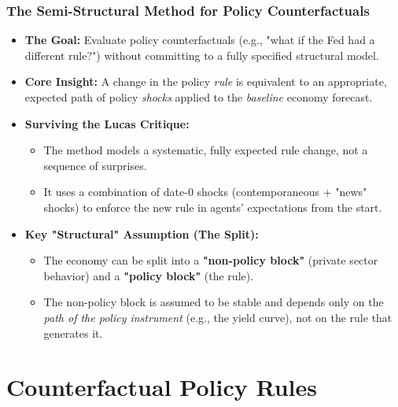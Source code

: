 \documentclass{beamer}
\begin{document}
\begin{frame}
\frametitle{The Semi-Structural Method for Policy Counterfactuals}

\begin{itemize}
    \item \textbf{The Goal:} Evaluate policy counterfactuals (e.g., "what if the Fed had a different rule?") without committing to a fully specified structural model.


    \item \textbf{Core Insight:} A change in the policy \textit{rule} is equivalent to an appropriate, expected path of policy \textit{shocks} applied to the \textit{baseline} economy forecast.


   \item \textbf{Surviving the Lucas Critique:}
    \begin{itemize}
        \item The method models a systematic, \alert{fully expected} rule change, not a sequence of surprises.
        \item It uses a combination of date-0 shocks (contemporaneous + "news" shocks) to enforce the new rule in agents' expectations from the start.
    \end{itemize}

    
   \item \textbf{Key "Structural" Assumption (The Split):}
    \begin{itemize}
        \item The economy can be split into a \textbf{"non-policy block"} (private sector behavior) and a \textbf{"policy block"} (the rule).
        \item The non-policy block is assumed to be stable and depends \alert{only} on the \textit{path of the policy instrument} (e.g., the yield curve), not on the rule that generates it.
    \end{itemize}
\end{itemize}
\end{frame}

\section{Counterfactual Policy Rules}
\end{document}
